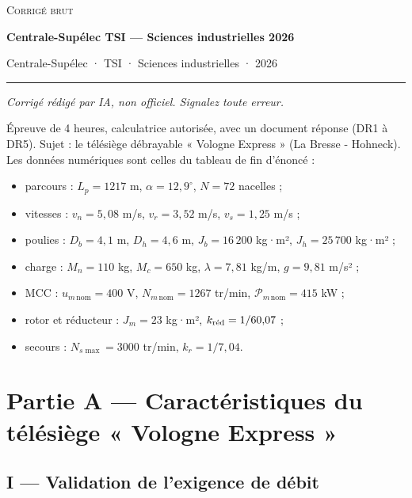 \documentclass[11pt,a4paper]{article}
\providecommand{\tightlist}{\setlength{\itemsep}{0pt}\setlength{\parskip}{0pt}}
\begin{document}
\thispagestyle{plain}
\begin{center}
  {\small\scshape Corrigé brut}\par\smallskip
  {\LARGE\bfseries Centrale-Supélec TSI — Sciences industrielles 2026\par}\medskip
  {\large Centrale-Supélec · TSI · Sciences industrielles · 2026\par}
\end{center}
\vspace{2pt}\hrule\vspace{8pt}

\emph{Corrigé rédigé par IA, non officiel. Signalez toute erreur.}

Épreuve de 4 heures, calculatrice autorisée, avec un document réponse (DR1 à DR5). Sujet : le télésiège débrayable « Vologne Express » (La Bresse - Hohneck). Les données numériques sont celles du tableau de fin d'énoncé :

\begin{itemize}
\tightlist
\item
  parcours : \(L_p=1217\) m, \(\alpha=12{,}9^\circ\), \(N=72\) nacelles ;
\item
  vitesses : \(v_n=5{,}08\) m/s, \(v_r=3{,}52\) m/s, \(v_s=1{,}25\) m/s ;
\item
  poulies : \(D_b=4{,}1\) m, \(D_h=4{,}6\) m, \(J_b=16\,200\) kg·m², \(J_h=25\,700\) kg·m² ;
\item
  charge : \(M_n=110\) kg, \(M_c=650\) kg, \(\lambda=7{,}81\) kg/m, \(g=9{,}81\) m/s² ;
\item
  MCC : \(u_{m\,\text{nom}}=400\) V, \(N_{m\,\text{nom}}=1267\) tr/min, \(\mathscr P_{m\,\text{nom}}=415\) kW ;
\item
  rotor et réducteur : \(J_m=23\) kg·m², \(k_{\text{\text{réd}}}=1/60{,}07\) ;
\item
  secours : \(N_{s\max}=3000\) tr/min, \(k_r=1/7{,}04\).
\end{itemize}

\hypertarget{partie-a-caractuxe9ristiques-du-tuxe9luxe9siuxe8ge-vologne-express}{%
\section{Partie A --- Caractéristiques du télésiège « Vologne Express »}\label{partie-a-caractuxe9ristiques-du-tuxe9luxe9siuxe8ge-vologne-express}}

\hypertarget{i-validation-de-lexigence-de-duxe9bit}{%
\subsection{I --- Validation de l'exigence de débit}\label{i-validation-de-lexigence-de-duxe9bit}}
\end{document}
